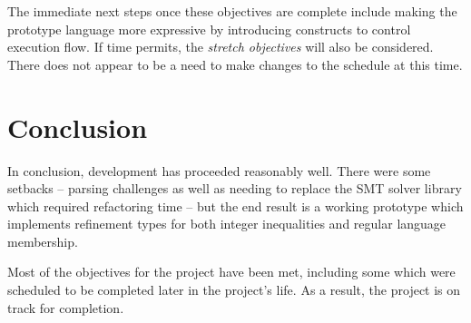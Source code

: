 \documentclass[a4paper]{article}
\begin{document}
The immediate next steps once these objectives are complete include making the prototype language more expressive by introducing constructs to control execution flow. If time permits, the \emph{stretch objectives} will also be considered. There does not appear to be a need to make changes to the schedule at this time.


\pagebreak[5]

\section{Conclusion}

In conclusion, development has proceeded reasonably well. There were some setbacks -- parsing challenges as well as needing to replace the SMT solver library which required refactoring time -- but the end result is a working prototype which implements refinement types for both integer inequalities and regular language membership.

Most of the objectives for the project have been met, including some which were scheduled to be completed later in the project's life. As a result, the project is on track for completion.





\end{document}
